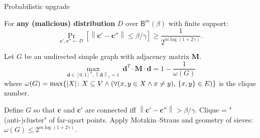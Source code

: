 \documentclass[xcolor=table,10pt,aspectratio=169]{beamer}
\renewcommand{\vec}[1]{\ensuremath{\mathbf{#1}}\xspace}
\newcommand{\norm}[1]{\left\lVert#1\right\rVert}
\providecommand{\mat}[1]{\ensuremath{\vec{#1}}\xspace}
\newcommand{\ball}[2]{\ensuremath{\mathsf{B}^{#1}{(#2)}}}
\begin{document}
\begin{frame}[label={sec:orgfd56e18},t]{Probabilistic upgrade}
\begin{lemma}
For \textbf{any (malicious) distribution} \(D\) over \(\ball{m}{\beta}\) with finite support:
\[
\Pr_{\vec{c}', \vec{c}'' \gets D}\left[\norm{\vec{c}' - \vec{c}''} \leq \beta/\gamma\right] \geq \frac{1}{2^{m \log(1+2\gamma)}}.
\]
\label{lem:prob}
\end{lemma}

\pause

\begin{theorem}
Let \(G\) be an undirected simple graph with adjacency matrix \(\mat{M}\).
\[
  \max_{\vec{d} \in [0,1]^n, \norm{\vec{d}}_1 = 1}\ \vec{d}^T \cdot \mat{M} \cdot \vec{d} = 1 - \frac{1}{\omega(G)}
\]
where \(\omega(G) = \max\{ \abs{X} \colon X \subseteq V \wedge (\forall (x,y \in X \wedge x \neq y),\, \{x,y\} \in E)\}\) is the clique number.
\label{thm:motzkin-straus}
\end{theorem}

\pause

Define \(G\) so that \(\vec{c}\) and \(\vec{c}'\) are connected iff \(\norm{\vec{c}'-\vec{c}''} > \beta/\gamma\). Clique = "(anti-)cluster" of far-apart points. Apply Motzkin--Straus and geometry of sieves: \(\omega(G) \leq 2^{m \log(1+2\gamma)}\).
\end{frame}
\end{document}

